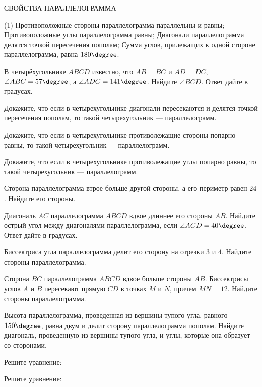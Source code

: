 \begin{class}[number=5]
	\begin{center}
		СВОЙСТВА ПАРАЛЛЕЛОГРАММА 
	\end{center}
	\begin{tasks}(1)
		\task Противоположные стороны параллелограмма параллельны и равны;
		\task Противоположные углы параллелограмма равны;
		\task Диагонали параллелограмма делятся точкой пересечения пополам;
		\task Сумма углов, прилежащих к одной стороне параллелограмма, равна \( 180\degree \).
	\end{tasks}
	\begin{listofex}
		\item В четырёхугольнике \( ABCD \) известно, что \( AB=BC \) и \( AD=DC \),
		\( \angle ABC = 57\degree \), а \( \angle ADC = 141\degree \). Найдите \( \angle BCD \). Ответ дайте в градусах.
		\item Докажите, что если в четырехугольнике диагонали пересекаются и делятся точкой пересечения пополам, то такой четырехугольник --- параллелограмм.
		\item Докажите, что если в четырехугольнике противолежащие стороны попарно равны, то такой четырехугольник --- параллелограмм.
		\item Докажите, что если в четырехугольнике противолежащие углы попарно равны, то такой четырехугольник --- параллелограмм.
		\item Сторона параллелограмма втрое больше другой стороны, а его периметр равен \( 24 \). Найдите его стороны.
		\item Диагональ \( AC \) параллелограмма \( ABCD \) вдвое длиннее его стороны \( AB \).
		Найдите острый угол между диагоналями параллелограмма, если \( \angle ACD=40\degree \).
		Ответ дайте в градусах.
		\item Биссектриса угла параллелограмма делит его сторону на отрезки \( 3 \) и \( 4 \). Найдите стороны параллелограмма.
		\item Сторона \( BC \) параллелограмма \( ABCD \) вдвое больше стороны \( AB \). Биссектрисы углов \( A \) и \( B \) пересекают прямую \( CD \) в точках \( M \) и \( N \), причем \( MN=12 \). Найдите стороны параллелограмма.
		\item Высота параллелограмма, проведенная из вершины тупого угла,
		равного \( 150\degree \), равна двум и делит сторону
		параллелограмма пополам. Найдите диагональ,
		проведенную из вершины тупого угла, и углы,
		которые она образует со сторонами.
		\item Решите уравнение:
		\begin{itasks}[4]
			\task {}
			\task {}
			\task {}
			\task {}
		\end{itasks}
		\item Решите уравнение:
		\begin{itasks}[2]
			\task {}
			\task {}
		\end{itasks}
	\end{listofex}
\end{class}
